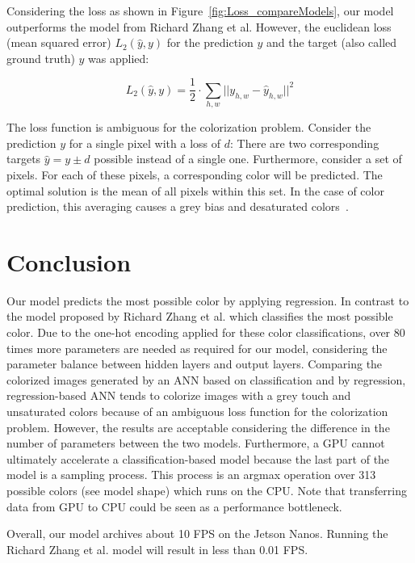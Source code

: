 \documentclass[a4paper,12pt, listof=totoc,toc=sectionentrywithdots]{scrartcl}
\begin{document}
Considering the loss as shown in Figure~\ref{fig:Loss_compareModels},
our model outperforms the model from Richard Zhang et al.
However, the euclidean loss (mean squared error) $L_2(\hat{y}, y)$ for the prediction $y$ and the target (also called ground truth) $\hat{y}$ was applied:

\[ L_2(\hat{y}, y) = \frac{1}{2} \cdot \sum_{h,w} || y_{h,w} - \hat{y}_{h,w} ||^{2} \]

The loss function is ambiguous for the colorization problem.
Consider the prediction $y$ for a single pixel with a loss of $d$:
There are two corresponding targets $\hat{y} = y \pm d$ possible instead of a single one.
Furthermore, consider a set of pixels. For each of these pixels, a corresponding color will be predicted.
The optimal solution is the mean of all pixels within this set.
In the case of color prediction, this averaging causes a grey bias and desaturated colors~\cite{colorize}.



\section{Conclusion}


Our model predicts the most possible color by applying regression.
In contrast to the model proposed by Richard Zhang et al. which classifies the most possible color.
Due to the one-hot encoding applied for these color classifications, over 80 times more parameters are needed as required for our model, considering the parameter balance between hidden layers and output layers.
Comparing the colorized images generated by an ANN based on classification and by regression, regression-based ANN tends to colorize images with a grey touch and unsaturated colors because of an ambiguous loss function for the colorization problem.
However, the results are acceptable considering the difference in the number of parameters between the two models.
Furthermore, a GPU cannot ultimately accelerate a classification-based model because the last part of the model is a sampling process.
This process is an argmax operation over 313 possible colors (see model shape) which runs on the CPU.
Note that transferring data from GPU to CPU could be seen as a performance bottleneck.

Overall, our model archives about 10 FPS on the Jetson Nanos.
Running the Richard Zhang et al. model will result in less than 0.01 FPS.



 








\end{document}
